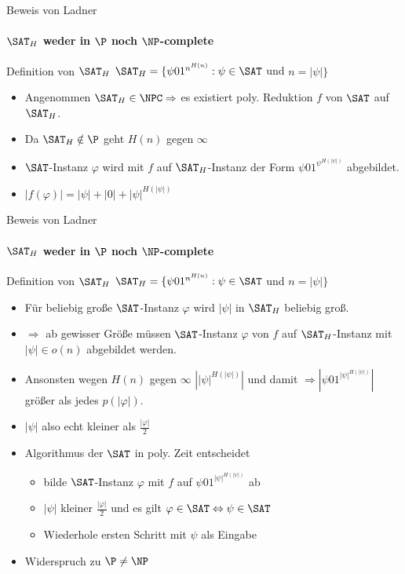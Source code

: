 \begin{frame}{Beweis von Ladner}
		\framesubtitle{${\SAT}_H$ weder in $\P$ noch $\NP$-complete}
	
		\begin{KITinfoblock}{Definition von ${\SAT}_H$}	
			${\SAT}_H = \lbrace \psi 01^{n^{H(n)}} : \psi \in \SAT$ und $ n = |\psi| \rbrace$
		\end{KITinfoblock}
		
		
		\bigskip
		\pause
		\bigskip
		
		\begin{itemize}[<+->]
			\item Angenommen ${\SAT}_H \in \NPC \Rightarrow $ es existiert poly. Reduktion $f$ von $\SAT$ auf ${\SAT}_H$.
			\item Da ${\SAT}_H \notin \P $ geht $H(n)$ gegen $\infty$ 
			\item $\SAT$-Instanz $\varphi$ wird mit $f$ auf ${\SAT}_H$-Instanz der Form $\psi01^{{\psi}^{H(|\psi|)}}$ abgebildet.
			\item $|f(\varphi)|=|\psi| + |0| + {|\psi|}^{H(|\psi|)}$
		\end{itemize}
\end{frame}
\begin{frame}{Beweis von Ladner}
	\framesubtitle{${\SAT}_H$ weder in $\P$ noch $\NP$-complete}
	
	\begin{KITinfoblock}{Definition von ${\SAT}_H$}	
		${\SAT}_H = \lbrace \psi 01^{n^{H(n)}} : \psi \in \SAT$ und $ n = |\psi| \rbrace$
	\end{KITinfoblock}
		\begin{itemize}[<+->]
		\item Für beliebig große $\SAT$-Instanz $\varphi$ wird $|\psi|$ in ${\SAT}_H$ beliebig groß.
		\item $\Rightarrow$ ab gewisser Größe müssen $\SAT$-Instanz $\varphi$ von $f$ auf ${\SAT}_H$-Instanz mit $|\psi| \in o(n)$  abgebildet werden.
		 
		\item Ansonsten wegen $H(n)$ gegen $\infty$ \newline $|{|\psi|}^{H(|\psi|)}|$  und damit $ \Rightarrow|\psi01^{|\psi|^{H(|\psi|)}} |$  größer als jedes $p(|\varphi|)$.
		\item $|\psi|$ also echt kleiner als $\frac{|\varphi|}{2}$
		\item Algorithmus der $\SAT$ in poly. Zeit entscheidet 
			\begin{itemize}
				\item bilde $\SAT$-Instanz $\varphi$ mit $f$ auf $\psi01^{|\psi|^{H(|\psi|)}}$ ab
				\item $|\psi|$ kleiner $\frac{|\varphi|}{2}$ und es gilt $\varphi \in \SAT \Leftrightarrow \psi \in \SAT$ 
				\item Wiederhole ersten Schritt mit $\psi$ als Eingabe
			\end{itemize}
		\item Widerspruch zu $\P \neq \NP$
		\end{itemize}
\end{frame}